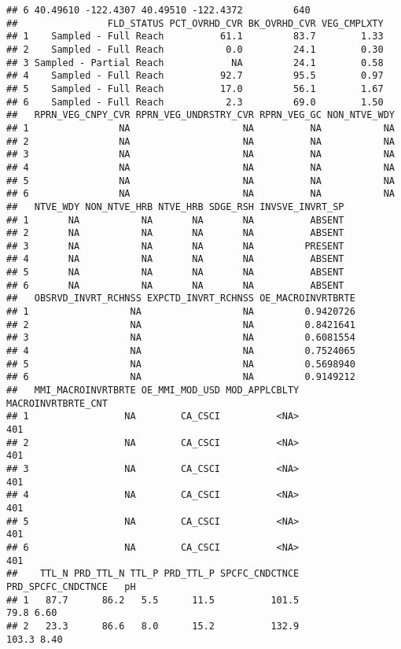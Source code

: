 \documentclass[]{article}
\begin{document}
\begin{verbatim}
## 6 40.49610 -122.4307 40.49510 -122.4372         640
##                FLD_STATUS PCT_OVRHD_CVR BK_OVRHD_CVR VEG_CMPLXTY
## 1    Sampled - Full Reach          61.1         83.7        1.33
## 2    Sampled - Full Reach           0.0         24.1        0.30
## 3 Sampled - Partial Reach            NA         24.1        0.58
## 4    Sampled - Full Reach          92.7         95.5        0.97
## 5    Sampled - Full Reach          17.0         56.1        1.67
## 6    Sampled - Full Reach           2.3         69.0        1.50
##   RPRN_VEG_CNPY_CVR RPRN_VEG_UNDRSTRY_CVR RPRN_VEG_GC NON_NTVE_WDY
## 1                NA                    NA          NA           NA
## 2                NA                    NA          NA           NA
## 3                NA                    NA          NA           NA
## 4                NA                    NA          NA           NA
## 5                NA                    NA          NA           NA
## 6                NA                    NA          NA           NA
##   NTVE_WDY NON_NTVE_HRB NTVE_HRB SDGE_RSH INVSVE_INVRT_SP
## 1       NA           NA       NA       NA          ABSENT
## 2       NA           NA       NA       NA          ABSENT
## 3       NA           NA       NA       NA         PRESENT
## 4       NA           NA       NA       NA          ABSENT
## 5       NA           NA       NA       NA          ABSENT
## 6       NA           NA       NA       NA          ABSENT
##   OBSRVD_INVRT_RCHNSS EXPCTD_INVRT_RCHNSS OE_MACROINVRTBRTE
## 1                  NA                  NA         0.9420726
## 2                  NA                  NA         0.8421641
## 3                  NA                  NA         0.6081554
## 4                  NA                  NA         0.7524065
## 5                  NA                  NA         0.5698940
## 6                  NA                  NA         0.9149212
##   MMI_MACROINVRTBRTE OE_MMI_MOD_USD MOD_APPLCBLTY MACROINVRTBRTE_CNT
## 1                 NA        CA_CSCI          <NA>                401
## 2                 NA        CA_CSCI          <NA>                401
## 3                 NA        CA_CSCI          <NA>                401
## 4                 NA        CA_CSCI          <NA>                401
## 5                 NA        CA_CSCI          <NA>                401
## 6                 NA        CA_CSCI          <NA>                401
##    TTL_N PRD_TTL_N TTL_P PRD_TTL_P SPCFC_CNDCTNCE PRD_SPCFC_CNDCTNCE   pH
## 1   87.7      86.2   5.5      11.5          101.5               79.8 6.60
## 2   23.3      86.6   8.0      15.2          132.9              103.3 8.40

\end{verbatim}
\end{document}
